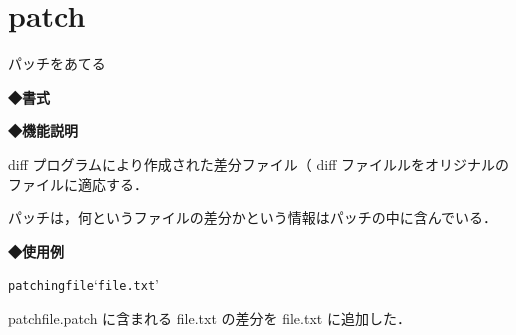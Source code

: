 \label{cmd:patch}
\section{patch}
パッチをあてる\par
{\bf ◆書式}
\begin{center}
\begin{screen}
\begin{alltt}
 % patch < パッチファイル
\end{alltt}
\end{screen}
\end{center}

{\bf ◆機能説明}

diff プログラムにより作成された差分ファイル（ diff ファイルルをオリジナルのファイルに適応する．\par
パッチは，何というファイルの差分かという情報はパッチの中に含んでいる．\par

{\bf ◆使用例}
\begin{center}
\begin{breakbox}
\begin{alltt}
 % \underline{patch < patchfile.patch}  \keybox{Enter}
 patching file `file.txt'
 %
\end{alltt}
\end{breakbox}
\end{center}

patchfile.patch に含まれる file.txt の差分を file.txt に追加した．\
\clearpage

